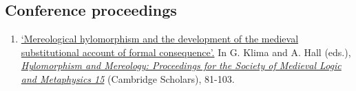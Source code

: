 \subsection{Conference proceedings}
\begin{enumerate}
	\setcounter{enumi}{\value{publicationCounter}}	%
	\item {}
	{}
	{
		\href{https://www.academia.edu/36407777/Mereological_hylomorphism_and_the_development_of_the_medieval_substitutional_account_of_formal_consequence}{`Mereological hylomorphism and the development of the medieval substitutional account of formal consequence'.} In G. Klima and A. Hall (eds.), \href{https://www.cambridgescholars.com/product/978-1-5275-1163-7}{\emph{Hylomorphism and Mereology: Proceedings for the Society of Medieval Logic and Metaphysics 15}} (Cambridge Scholars), 81-103.}
	{}
	\setcounter{publicationCounter}{\value{enumi}}	%
\end{enumerate}

